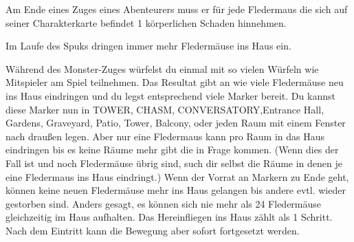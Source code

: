 





Am Ende eines Zuges eines Abenteurers muss er für jede Fledermaus die sich auf seiner Charakterkarte befindet 1 körperlichen Schaden hinnehmen.


Im Laufe des Spuks dringen immer mehr Fledermäuse ins Haus ein.

  \begin{itemize}
    \bitem Während des Monster-Zuges würfelst du einmal mit so vielen Würfeln wie Mitspieler am Spiel teilnehmen. Das Resultat gibt an wie viele Fledermäuse neu ins Haus eindringen und du legst entsprechend viele Marker bereit.
    \bitem Du kannst diese Marker nun in TOWER, CHASM, CONVERSATORY,Entrance Hall, Gardens, Graveyard, Patio, Tower, Balcony,  oder jeden Raum mit einem Fenster nach draußen legen. Aber nur eine Fledermaus kann pro Raum in das Haus eindringen bis es keine Räume mehr gibt die in Frage kommen. (Wenn dies der Fall ist und noch Fledermäuse übrig sind, such dir selbst die Räume in denen je eine Fledermaus ins Haus eindringt.)
    \bitem Wenn der Vorrat an Markern zu Ende geht, können keine neuen Fledermäuse mehr ins Haus gelangen bis andere evtl. wieder gestorben sind. Anders gesagt, es können sich nie mehr als 24 Fledermäuse gleichzeitig im Haus aufhalten.
    \bitem Das Hereinfliegen ins Haus zählt als 1 Schritt. Nach dem Eintritt kann die Bewegung aber sofort fortgesetzt werden.

    \end{itemize}

